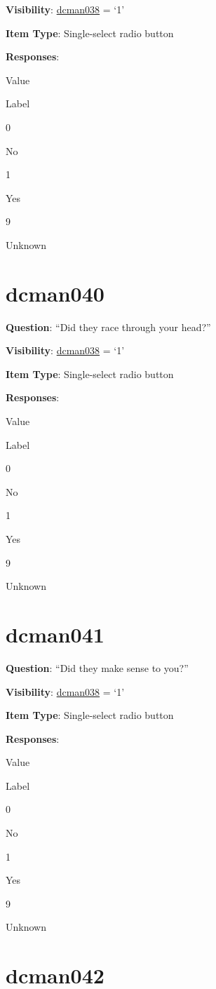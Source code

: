 \documentclass[]{book}
\begin{document}
\textbf{Visibility}: \protect\hyperlink{dcman038}{dcman038} = `1'

\textbf{Item Type}: Single-select radio button

\textbf{Responses}:

Value

Label

0

No

1

Yes

9

Unknown

\hypertarget{dcman040}{%
\section{dcman040}\label{dcman040}}

\textbf{Question}: ``Did they race through your head?''

\textbf{Visibility}: \protect\hyperlink{dcman038}{dcman038} = `1'

\textbf{Item Type}: Single-select radio button

\textbf{Responses}:

Value

Label

0

No

1

Yes

9

Unknown

\hypertarget{dcman041}{%
\section{dcman041}\label{dcman041}}

\textbf{Question}: ``Did they make sense to you?''

\textbf{Visibility}: \protect\hyperlink{dcman038}{dcman038} = `1'

\textbf{Item Type}: Single-select radio button

\textbf{Responses}:

Value

Label

0

No

1

Yes

9

Unknown

\hypertarget{dcman042}{%
\section{dcman042}\label{dcman042}}
\end{document}
